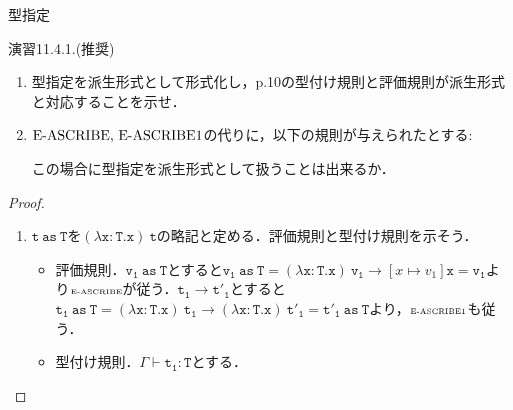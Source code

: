 \documentclass[9pt]{beamer}
\begin{document}
\begin{frame}{型指定}
\begin{alertblock}{演習11.4.1.(推奨)}
    \begin{enumerate}
    \item 型指定を派生形式として形式化し，p.10の型付け規則と評価規則が派生形式と対応することを示せ．
    \item $\text{\rm{E-ASCRIBE, E-ASCRIBE1}}$の代りに，以下の規則が与えられたとする:\begin{prooftree}
    \end{prooftree}
    この場合に型指定を派生形式として扱うことは出来るか．
    \end{enumerate}
\end{alertblock}
\begin{proof}
    \begin{enumerate}
    \item $\mathtt{t\ as\ T}$を$\mathtt{(\lambda x : T. x)\ t}$の略記と定める．評価規則と型付け規則を示そう．\begin{itemize}
    \item 評価規則．$\mathtt{v_{1}\ as\ T}$とすると$\mathtt{v_{1}\ as\ T} = \mathtt{(\lambda x : T. x)\ v_{1}} \rightarrow \left[x\mapsto v_{1}\right] \mathtt{x} = \mathtt{v_{1}}$より$\text{\tiny\rm{E-ASCRIBE}}$が従う．$\mathtt{t_{1}\rightarrow t'_{1}}$とすると$\mathtt{t_{1}\ as\ T} = \mathtt{(\lambda x:T. x)\ t_{1}}\rightarrow\mathtt{(\lambda x: T. x)\ t'_{1}} = \mathtt{t'_{1}\ as\ T}$より，$\text{\tiny\rm{E-ASCRIBE1}}$も従う．
    \item 型付け規則．$\Gamma\vdash\mathtt{t_{1}:T}$とする．
    \end{itemize}
    \end{enumerate}
\end{proof}
\end{frame}
\end{document}
